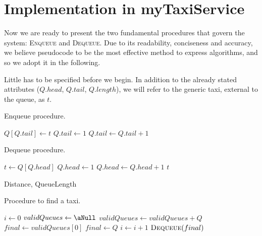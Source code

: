 \section{Implementation in myTaxiService}
Now we are ready to present the two fundamental procedures that govern the system: \textsc{Enqueue} and \textsc{Dequeue}. Due to its readability, conciseness and accuracy, we believe pseudocode to be the most effective method to express algorithms, and so we adopt it in the following.

Little has to be specified before we begin. In addition to the already stated attributes ($Q.head$, $Q.tail$, $Q.length$), we will refer to the generic taxi, external to the queue, as $t$.


\begin{algorithm}
\caption{Enqueue procedure.} \label{alg:enqueue}
\begin{algorithmic}[1]
	\State $Q\left[Q.tail\right] \gets t$
		\State $Q.tail \gets 1$ \label{line:enqueueWrap}
	\Else
		\State $Q.tail \gets Q.tail + 1$
	\EndIf
\EndProcedure
\end{algorithmic}
\end{algorithm}


\begin{algorithm}
\caption{Dequeue procedure.} \label{alg:dequeue}
\begin{algorithmic}[1]
	\State $t \gets Q\left[Q.head\right]$
		\State $Q.head \gets 1$
	\Else
		\State $Q.head \gets Q.head + 1$
	\EndIf
	\State \Return $t$ 
\EndProcedure
\end{algorithmic}
\end{algorithm}

\newpage

Distance, QueueLength
\begin{algorithm}
\caption{Procedure to find a taxi.} \label{alg:getTaxi}
\begin{algorithmic}[1]
 
	\State $i \gets 0$
	\Repeat
		\State $validQueues \gets \aNull$
				\State $validQueues \gets validQueues + Q$
			\EndIf
		\EndFor
		\State $final \gets validQueues\left[0\right]$
				\State $final \gets Q$
			\EndIf
		\EndFor
		\State $i \gets i + 1$
	\State \Return $\Call{Dequeue}{final}$ 
\EndProcedure
\end{algorithmic}
\end{algorithm}

